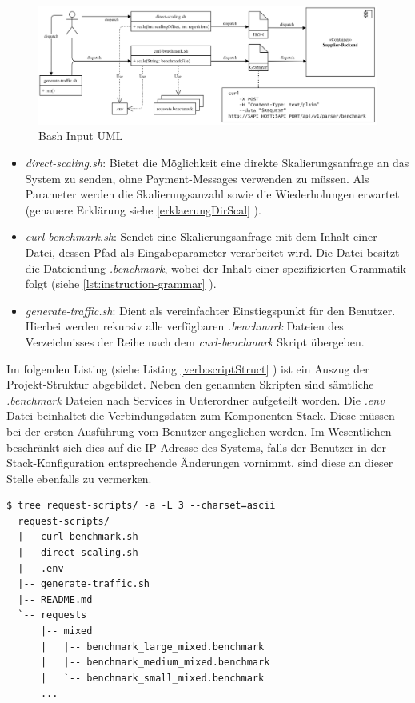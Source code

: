 \begin{figure}[ht!]
	\centering
	\includegraphics[width=\linewidth]{kapitel/problemloesung/implementierung/_img/input-uml}
	\caption[Bash Input UML]{Bash Input UML}
	\label{fig:bashOverview}
\end{figure}

\begin{itemize}
  \item \emph{direct-scaling.sh}: Bietet die Möglichkeit eine direkte Skalierungsanfrage an das System zu senden, ohne Payment-Messages verwenden zu müssen. Als Parameter werden die Skalierungsanzahl sowie die Wiederholungen erwartet (genauere Erklärung siehe \ref{erklaerungDirScal} ).
  \item \emph{curl-benchmark.sh}: Sendet eine Skalierungsanfrage mit dem Inhalt einer Datei, dessen Pfad als Eingabeparameter verarbeitet wird. Die Datei besitzt die Dateiendung \emph{.benchmark}, wobei der Inhalt einer spezifizierten Grammatik folgt (siehe \ref{lst:instruction-grammar} ).
  \item \emph{generate-traffic.sh}: Dient als vereinfachter Einstiegspunkt für den Benutzer. Hierbei werden rekursiv alle verfügbaren \emph{.benchmark} Dateien des Verzeichnisses der Reihe nach dem \emph{curl-benchmark} Skript übergeben.
\end{itemize}

Im folgenden Listing (siehe Listing \ref{verb:scriptStruct} ) ist ein Auszug der Projekt-Struktur abgebildet. Neben den genannten Skripten sind sämtliche \emph{.benchmark} Dateien nach Services in Unterordner aufgeteilt worden. Die \emph{.env} Datei beinhaltet die Verbindungsdaten zum Komponenten-Stack. Diese müssen bei der ersten Ausführung vom Benutzer angeglichen werden. Im Wesentlichen beschränkt sich dies auf die IP-Adresse des Systems, falls der Benutzer in der Stack-Konfiguration entsprechende Änderungen vornimmt, sind diese an dieser Stelle ebenfalls zu vermerken.

\label{verb:scriptStruct}
\begin{minipage}{\linewidth}
\begin{lstlisting}[caption={Bash Skript - Struktur},style=bashStyle]
  $ tree request-scripts/ -a -L 3 --charset=ascii
  request-scripts/
  |-- curl-benchmark.sh
  |-- direct-scaling.sh
  |-- .env
  |-- generate-traffic.sh
  |-- README.md
  `-- requests
      |-- mixed
      |   |-- benchmark_large_mixed.benchmark
      |   |-- benchmark_medium_mixed.benchmark
      |   `-- benchmark_small_mixed.benchmark
      ...
\end{lstlisting}
\end{minipage}

